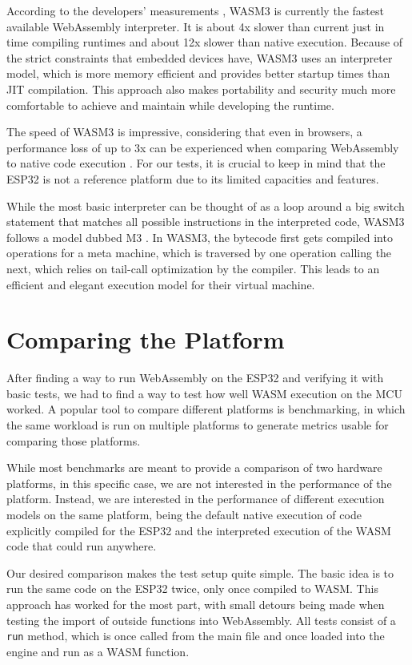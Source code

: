 According to the developers' measurements \autocite{shymanskyy_wasm3_2020}, WASM3 is currently the fastest available WebAssembly interpreter. It is about 4x slower than current just in time compiling runtimes and about 12x slower than native execution. Because of the strict constraints that embedded devices have, WASM3 uses an interpreter model, which is more memory efficient and provides better startup times than JIT compilation. This approach also makes portability and security much more comfortable to achieve and maintain while developing the runtime.

The speed of WASM3 is impressive, considering that even in browsers, a performance loss of up to 3x can be experienced when comparing WebAssembly to native code execution \autocite{jangda_not_2019}. For our tests, it is crucial to keep in mind that the ESP32 is not a reference platform due to its limited capacities and features.

While the most basic interpreter can be thought of as a loop around a big switch statement that matches all possible instructions in the interpreted code, WASM3 follows a model dubbed M3 \autocite{shymanskyy_wasm3interpreter_2020}. In WASM3, the bytecode first gets compiled into operations for a meta machine, which is traversed by one operation calling the next, which relies on tail-call optimization by the compiler. This leads to an efficient and elegant execution model for their virtual machine.

\section{Comparing the Platform}
After finding a way to run WebAssembly on the ESP32 and verifying it with basic tests, we had to find a way to test how well WASM execution on the MCU worked. A popular tool to compare different platforms is benchmarking, in which the same workload is run on multiple platforms to generate metrics usable for comparing those platforms.

While most benchmarks are meant to provide a comparison of two hardware platforms, in this specific case, we are not interested in the performance of the platform. Instead, we are interested in the performance of different execution models on the same platform, being the default native execution of code explicitly compiled for the ESP32 and the interpreted execution of the WASM code that could run anywhere.

Our desired comparison makes the test setup quite simple. The basic idea is to run the same code on the ESP32 twice, only once compiled to WASM. This approach has worked for the most part, with small detours being made when testing the import of outside functions into WebAssembly. All tests consist of a \lstinline{run} method, which is once called from the main file and once loaded into the engine and run as a WASM function.

